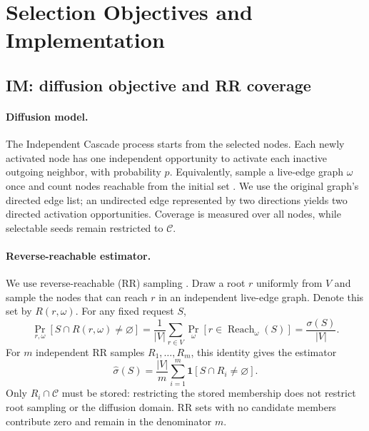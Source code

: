 \clearpage
\section{Selection Objectives and Implementation}
\label{app:selectors}

\subsection{IM: diffusion objective and RR coverage}
\label{app:im-details}

\paragraph{Diffusion model.}
The Independent Cascade process starts from the selected nodes. Each newly activated node has one independent opportunity to activate each inactive outgoing neighbor, with probability $p$. Equivalently, sample a live-edge graph $\omega$ once and count nodes reachable from the initial set \citep{kempe2003maximizing}. We use the original graph's directed edge list; an undirected edge represented by two directions yields two directed activation opportunities. Coverage is measured over all nodes, while selectable seeds remain restricted to $\mathcal C$.

\paragraph{Reverse-reachable estimator.}
We use reverse-reachable (RR) sampling \citep{tang2014influence}. Draw a root $r$ uniformly from $V$ and sample the nodes that can reach $r$ in an independent live-edge graph. Denote this set by $R(r,\omega)$. For any fixed request $S$,
\begin{equation}
\Pr_{r,\omega}\!\left[S\cap R(r,\omega)\ne\varnothing\right]
=\frac{1}{|V|}\sum_{r\in V}
\Pr_\omega\!\left[r\in\operatorname{Reach}_{\omega}(S)\right]
=\frac{\sigma(S)}{|V|}.
\label{eq:rr-identity}
\end{equation}
For $m$ independent RR samples $R_1,\ldots,R_m$, this identity gives the estimator
\begin{equation}
\widehat{\sigma}(S)=\frac{|V|}{m}
\sum_{i=1}^{m}\mathbf{1}[S\cap R_i\ne\varnothing].
\label{eq:im-rr}
\end{equation}
Only $R_i\cap\mathcal C$ must be stored: restricting the stored membership does not restrict root sampling or the diffusion domain. RR sets with no candidate members contribute zero and remain in the denominator $m$.

